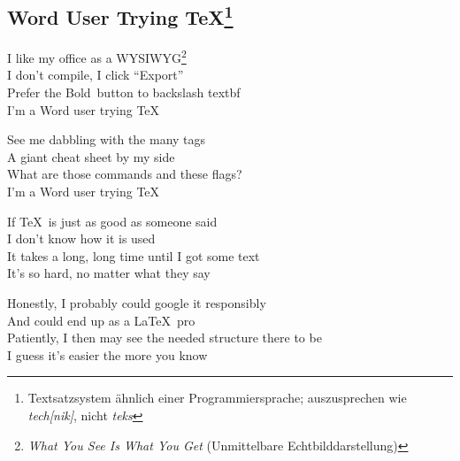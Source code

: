 \subsection[Word User Trying \TeX ]{Word User Trying \TeX\footnote{Textsatzsystem ähnlich einer Programmiersprache; auszusprechen wie \textit{tech[nik]}, nicht \textit{teks}} }

 I like my office as a WYSIWYG\footnote{\emph{What You See Is What You Get} (Unmittelbare Echtbilddarstellung)} \\
 I don’t compile, I click “Export” \\
 Prefer the \glqq Bold\grqq \ button to backslash textbf \\
I’m a Word user trying \TeX {} \\


See me dabbling with the many tags \\
A giant cheat sheet by my side \\
What are those commands and these flags? \\
I’m a Word user trying \TeX \\


If \TeX \ is just as good as someone said \\
I don’t know how it is used \\
It takes a long, long time until I got some text \\
It’s so hard, no matter what they say \\


\pagebreak

Honestly, I probably could google it responsibly \\
And could end up as a \LaTeX \ pro \\
Patiently, I then may see the needed structure there to be \\
I guess it's easier the more you know \\

